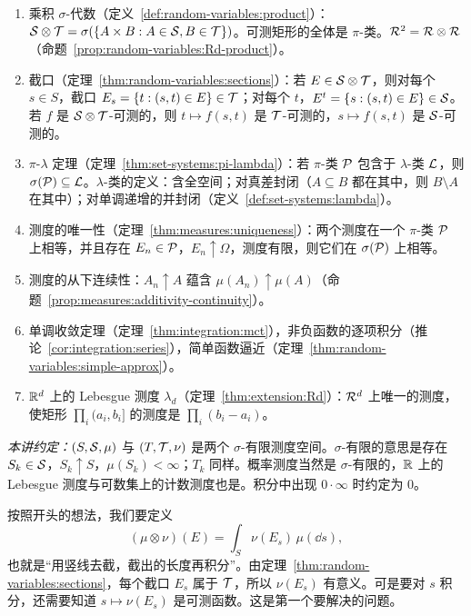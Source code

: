 \begin{enumerate}
\item 乘积 $\sigma$-代数（定义~\ref{def:random-variables:product}）：$\mathcal{S}\otimes\mathcal{T}=\sigma(\{A\times B:A\in\mathcal{S},B\in\mathcal{T}\})$。可测矩形的全体是 $\pi$-类。$\mathcal{R}^2=\mathcal{R}\otimes\mathcal{R}$（命题~\ref{prop:random-variables:Rd-product}）。
\item 截口（定理~\ref{thm:random-variables:sections}）：若 $E\in\mathcal{S}\otimes\mathcal{T}$，则对每个 $s\in S$，截口 $E_s=\{t:(s,t)\in E\}\in\mathcal{T}$；对每个 $t$，$E^t=\{s:(s,t)\in E\}\in\mathcal{S}$。若 $f$ 是 $\mathcal{S}\otimes\mathcal{T}$-可测的，则 $t\mapsto f(s,t)$ 是 $\mathcal{T}$-可测的，$s\mapsto f(s,t)$ 是 $\mathcal{S}$-可测的。
\item $\pi$-$\lambda$ 定理（定理~\ref{thm:set-systems:pi-lambda}）：若 $\pi$-类 $\mathcal{P}$ 包含于 $\lambda$-类 $\mathcal{L}$，则 $\sigma(\mathcal{P})\subseteq\mathcal{L}$。$\lambda$-类的定义：含全空间；对真差封闭（$A\subseteq B$ 都在其中，则 $B\setminus A$ 在其中）；对单调递增的并封闭（定义~\ref{def:set-systems:lambda}）。
\item 测度的唯一性（定理~\ref{thm:measures:uniqueness}）：两个测度在一个 $\pi$-类 $\mathcal{P}$ 上相等，并且存在 $E_n\in\mathcal{P}$，$E_n\uparrow\Omega$，测度有限，则它们在 $\sigma(\mathcal{P})$ 上相等。
\item 测度的从下连续性：$A_n\uparrow A$ 蕴含 $\mu(A_n)\uparrow\mu(A)$（命题~\ref{prop:measures:additivity-continuity}）。
\item 单调收敛定理（定理~\ref{thm:integration:mct}），非负函数的逐项积分（推论~\ref{cor:integration:series}），简单函数逼近（定理~\ref{thm:random-variables:simple-approx}）。
\item $\mathbb{R}^d$ 上的 Lebesgue 测度 $\lambda_d$（定理~\ref{thm:extension:Rd}）：$\mathcal{R}^d$ 上唯一的测度，使矩形 $\prod_i(a_i,b_i]$ 的测度是 $\prod_i(b_i-a_i)$。
\end{enumerate}

\emph{本讲约定：}$(S,\mathcal{S},\mu)$ 与 $(T,\mathcal{T},\nu)$ 是两个 $\sigma$-有限测度空间。$\sigma$-有限的意思是存在 $S_k\in\mathcal{S}$，$S_k\uparrow S$，$\mu(S_k)<\infty$；$T_k$ 同样。概率测度当然是 $\sigma$-有限的，$\mathbb{R}$ 上的 Lebesgue 测度与可数集上的计数测度也是。积分中出现 $0\cdot\infty$ 时约定为 $0$。


按照开头的想法，我们要定义
\[
(\mu\otimes\nu)(E)=\int_S\nu(E_s)\,\mu(\dd s),
\]
也就是“用竖线去截，截出的长度再积分”。由定理~\ref{thm:random-variables:sections}，每个截口 $E_s$ 属于 $\mathcal{T}$，所以 $\nu(E_s)$ 有意义。可是要对 $s$ 积分，还需要知道 $s\mapsto\nu(E_s)$ 是可测函数。这是第一个要解决的问题。

